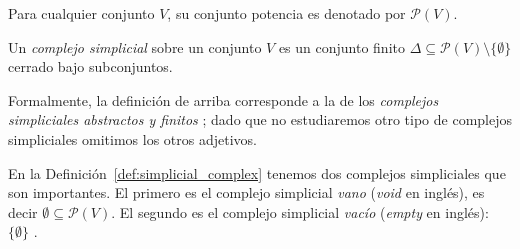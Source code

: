 \documentclass{standalone}
\begin{document}
	\noindent Para cualquier conjunto $V$, su conjunto potencia es denotado por $\mathcal{P}(V)$.
	
	\begin{definition}\label{def:simplicial_complex}
		Un \emph{complejo simplicial} sobre un conjunto $V$ es un conjunto finito $\Delta\subseteq\mathcal{P}(V)\setminus\{\emptyset\}$ cerrado bajo subconjuntos.
	\end{definition}
	
	Formalmente, la definición de arriba corresponde a la de los \emph{complejos simpliciales abstractos y finitos} \cite[Definition 2.1]{kozlov:2008:combinatorial:alg:topo}; dado que no estudiaremos otro tipo de complejos simpliciales omitimos los otros adjetivos. 
	
	\begin{remark}\label{rem:empty_complexes}
		En la Definición~\ref{def:simplicial_complex} tenemos dos complejos simpliciales que son importantes. El primero es el complejo simplicial \emph{vano} (\emph{void} en inglés), es decir $\emptyset\subseteq\mathcal{P}(V)$. El segundo es el complejo simplicial \emph{vacío} (\emph{empty} en inglés): $\{\emptyset\}$ \cite[Remark 2.3]{kozlov:2008:combinatorial:alg:topo}. 
	\end{remark}
\end{document}
